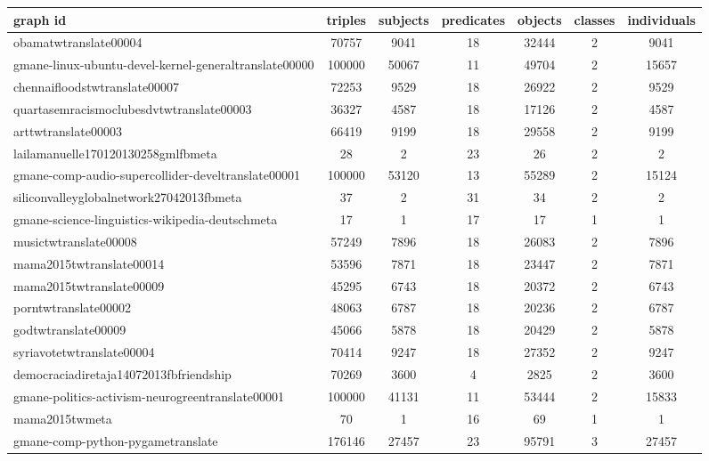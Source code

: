 \begin{table*}[h!]
\begin{center}
\begin{tabular}{| l | c | c | c | c | c | c |}\hline
graph id & triples & subjects & predicates & objects & classes & individuals \\\hline
obamatwtranslate00004 & 70757  & 9041  & 18  & 32444  & 2  & 9041 \\\hline
gmane-linux-ubuntu-devel-kernel-generaltranslate00000 & 100000  & 50067  & 11  & 49704  & 2  & 15657 \\\hline
chennaifloodstwtranslate00007 & 72253  & 9529  & 18  & 26922  & 2  & 9529 \\\hline
quartasemracismoclubesdvtwtranslate00003 & 36327  & 4587  & 18  & 17126  & 2  & 4587 \\\hline
arttwtranslate00003 & 66419  & 9199  & 18  & 29558  & 2  & 9199 \\\hline
lailamanuelle170120130258gmlfbmeta & 28  & 2  & 23  & 26  & 2  & 2 \\\hline
gmane-comp-audio-supercollider-develtranslate00001 & 100000  & 53120  & 13  & 55289  & 2  & 15124 \\\hline
siliconvalleyglobalnetwork27042013fbmeta & 37  & 2  & 31  & 34  & 2  & 2 \\\hline
gmane-science-linguistics-wikipedia-deutschmeta & 17  & 1  & 17  & 17  & 1  & 1 \\\hline
musictwtranslate00008 & 57249  & 7896  & 18  & 26083  & 2  & 7896 \\\hline
mama2015twtranslate00014 & 53596  & 7871  & 18  & 23447  & 2  & 7871 \\\hline
mama2015twtranslate00009 & 45295  & 6743  & 18  & 20372  & 2  & 6743 \\\hline
porntwtranslate00002 & 48063  & 6787  & 18  & 20236  & 2  & 6787 \\\hline
godtwtranslate00009 & 45066  & 5878  & 18  & 20429  & 2  & 5878 \\\hline
syriavotetwtranslate00004 & 70414  & 9247  & 18  & 27352  & 2  & 9247 \\\hline
democraciadiretaja14072013fbfriendship & 70269  & 3600  & 4  & 2825  & 2  & 3600 \\\hline
gmane-politics-activism-neurogreentranslate00001 & 100000  & 41131  & 11  & 53444  & 2  & 15833 \\\hline
mama2015twmeta & 70  & 1  & 16  & 69  & 1  & 1 \\\hline
gmane-comp-python-pygametranslate & 176146  & 27457  & 23  & 95791  & 3  & 27457 \\\hline

\end{tabular}
\end{center}
\end{table*}
